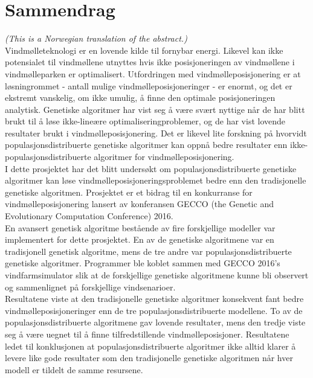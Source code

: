 \section*{Sammendrag}

\noindent \textit{(This is a Norwegian translation of the abstract.)}\\

\noindent Vindmølleteknologi er en lovende kilde til fornybar energi. Likevel kan ikke potensialet til vindmøllene utnyttes hvis ikke posisjoneringen av vindmøllene i vindmølleparken er optimalisert. Utfordringen med vindmølleposisjonering er at løsningrommet - antall mulige vindmølleposisjoneringer - er enormt, og det er ekstremt vanskelig, om ikke umulig, å finne den optimale posisjoneringen analytisk. Genetiske algoritmer har vist seg å være svært nyttige når de har blitt brukt til å løse ikke-lineære optimaliseringproblemer, og de har vist lovende resultater brukt i vindmølleposisjonering. Det er likevel lite forskning på hvorvidt populasjonsdistribuerte genetiske algoritmer kan oppnå bedre resultater enn ikke-populasjonsdistribuerte algoritmer for vindmølleposisjonering. \\

\noindent I dette prosjektet har det blitt undersøkt om populasjonsdistribuerte genetiske algoritmer kan løse vindmølleposisjoneringsproblemet bedre enn den tradisjonelle genetiske algoritmen. Prosjektet er et bidrag til en konkurranse for vindmølleposisjonering lansert av konferansen GECCO (the Genetic and Evolutionary Computation Conference) 2016.\\
    
\noindent En avansert genetisk algoritme bestående av fire forskjellige modeller var implementert for dette prosjektet. En av de genetiske algoritmene var en tradisjonell genetisk algoritme, mens de tre andre var populasjonsdistribuerte genetiske algoritmer. Programmer ble koblet sammen med GECCO 2016's vindfarmsimulator slik at de forskjellige genetiske algoritmene kunne bli observert og sammenlignet på forskjellige vindsenarioer.\\
    
\noindent Resultatene viste at den tradisjonelle genetiske algoritmer konsekvent fant bedre vindmølleposisjoneringer enn de tre populasjonsdistribuerte modellene. To av de populasjonsdistribuerte algoritmene gav lovende resultater, mens den tredje viste seg å være uegnet til å finne tilfredstillende vindmølleposisjoner. Resultatene ledet til konklusjonen at populasjonsdistribuerte algoritmer ikke alltid klarer å levere like gode resultater som den tradisjonelle genetiske algoritmen når hver modell er tildelt de samme resursene.\\